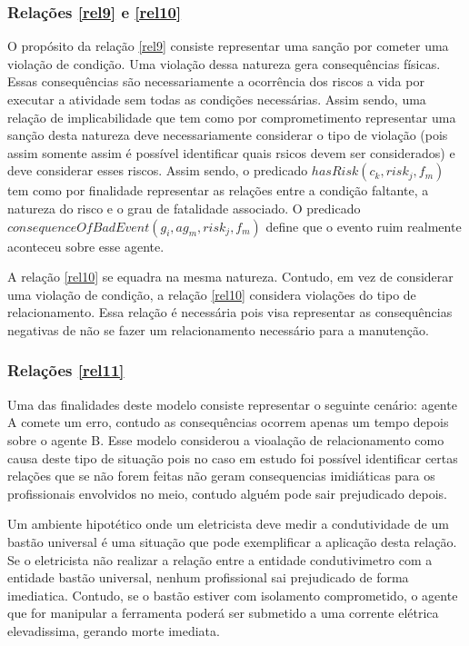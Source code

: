 \documentclass[12pt]{article}
\begin{document}
\subsubsection{Relações \ref{rel9} e \ref{rel10}}

O propósito da relação \ref{rel9} consiste representar uma sanção por cometer uma violação de condição. Uma violação dessa natureza gera consequências físicas. Essas consequências são necessariamente a ocorrência dos riscos a vida por executar a atividade sem todas as condições necessárias. Assim sendo, uma relação de implicabilidade que tem como por comprometimento representar uma sanção desta natureza deve necessariamente considerar o tipo de violação (pois assim somente assim é possível identificar quais rsicos devem ser considerados) e deve considerar esses riscos. Assim sendo, o predicado $hasRisk(c_k,risk_j,f_m)$ tem como por finalidade representar as relações entre a condição faltante, a natureza do risco e o grau de fatalidade associado. O predicado $consequenceOfBadEvent(g_i,ag_m,risk_j,f_m)$ define que o evento ruim realmente aconteceu sobre esse agente. 


A relação \ref{rel10} se equadra na mesma natureza. Contudo, em vez de considerar uma violação de condição, a relação \ref{rel10} considera violações do tipo de relacionamento. Essa relação é necessária pois visa representar as consequências negativas de não se fazer um relacionamento necessário para a manutenção. 


\subsubsection{Relações \ref{rel11}}

Uma das finalidades deste modelo consiste representar o seguinte cenário: agente A comete um erro, contudo as consequências ocorrem apenas um tempo depois sobre o agente B. Esse modelo considerou a vioalação de relacionamento como causa deste tipo de situação pois no caso em estudo foi possível identificar certas relações que se não forem feitas não geram consequencias imidiáticas para os profissionais envolvidos no meio, contudo alguém pode sair prejudicado depois. 

Um ambiente hipotético onde um eletricista deve medir a condutividade de um bastão universal é uma situação que pode exemplificar a aplicação desta relação. Se o eletricista não realizar a relação entre a entidade condutivimetro com a entidade bastão universal, nenhum profissional sai prejudicado de forma imediatica. Contudo, se o bastão estiver com isolamento comprometido, o agente que for manipular a ferramenta poderá ser submetido a uma corrente elétrica elevadissima, gerando morte imediata.
\end{document}
